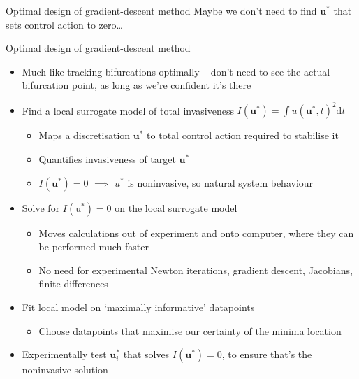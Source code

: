 \documentclass[presentation]{beamer}
\begin{document}
\begin{frame}[label={sec:orgdf4899d}]{Optimal design of gradient-descent method}
Maybe we don't need to find \(\mathbf{u}^*\) that sets control action to zero\ldots{}
\end{frame}

\begin{frame}[<+->][label={sec:org14652ca}]{Optimal design of gradient-descent method}
\begin{itemize}
\item Much like tracking bifurcations optimally -- don't need to see the actual bifurcation point, as long as we're confident it's there
\item Find a local surrogate model of total invasiveness \(I(\mathbf{u}^*) = \int u(\mathbf{u}^*,t)^2 \mathrm{d}t\) 
\begin{itemize}
\item Maps a discretisation \(\mathbf{u}^*\) to total control action required to stabilise it
\item Quantifies invasiveness of target \(\mathbf{u}^*\)
\item \(I(\mathbf{u}^*)=0\) \(\implies\) \(u^*\) is noninvasive, so natural system behaviour
\end{itemize}
\item Solve for \(I(\mathrm{u}^*)=0\) on the local surrogate model
\begin{itemize}
\item Moves calculations out of experiment and onto computer, where they can be performed much faster
\item No need for experimental Newton iterations, gradient descent, Jacobians, finite differences
\end{itemize}
\item Fit local model on `maximally informative' datapoints
\begin{itemize}
\item Choose datapoints that maximise our certainty of the minima location
\end{itemize}
\item Experimentally test \(\mathbf{u}^*_i\) that solves \(I(\mathbf{u}^*)=0\), to ensure that's the noninvasive solution
\end{itemize}
\end{frame}
\end{document}
